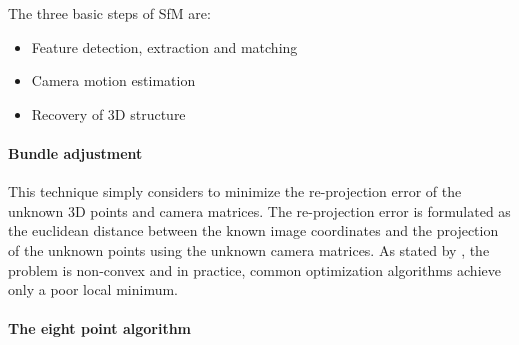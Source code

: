         	The three basic steps of SfM are:
        	\begin{itemize}
        		\item Feature detection, extraction and matching
        		\item Camera motion estimation
        		\item Recovery of 3D structure
        	\end{itemize}
        	
        	\paragraph{Bundle adjustment} 
        		This technique simply considers to minimize the re-projection error of the unknown 3D points and camera matrices.
        		The re-projection error is formulated as the euclidean distance between the known image coordinates and the projection of the unknown points using the unknown camera matrices.
        		As stated by \citet{survey2017}, the problem is non-convex and in practice, common optimization algorithms achieve only a poor local minimum.
        		
        	\paragraph{The eight point algorithm}
        	
        	
        	
        
        
        
        